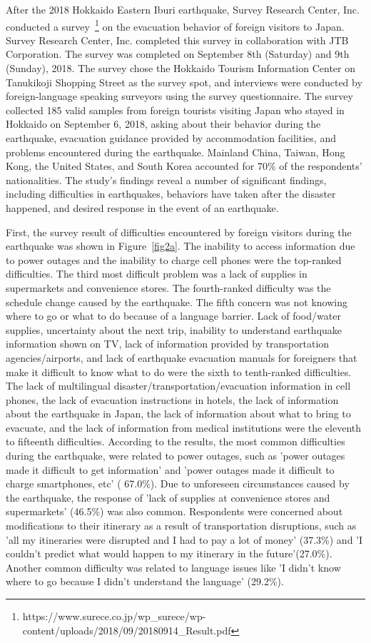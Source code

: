 After the 2018 Hokkaido Eastern Iburi earthquake, Survey Research Center, Inc. conducted a survey~\footnote{https://www.surece.co.jp/wp\_surece/wp-content/uploads/2018/09/20180914\_Result.pdf} on the evacuation behavior of foreign visitors to Japan. Survey Research Center, Inc. completed this survey in collaboration with JTB Corporation. The survey was completed on September 8th (Saturday) and 9th (Sunday), 2018. The survey chose the Hokkaido Tourism Information Center on Tanukikoji Shopping Street as the survey spot, and interviews were conducted by foreign-language speaking surveyors using the survey questionnaire. The survey collected 185 valid samples from foreign tourists visiting Japan who stayed in Hokkaido on September 6, 2018, asking about their behavior during the earthquake, evacuation guidance provided by accommodation facilities, and problems encountered during the earthquake. Mainland China, Taiwan, Hong Kong, the United States, and South Korea accounted for 70\% of the respondents' nationalities. The study's findings reveal a number of significant findings, including difficulties in earthquakes, behaviors have taken after the disaster happened, and desired response in the event of an earthquake.

First, the survey result of difficulties encountered by foreign visitors during the earthquake was shown in Figure~\ref{fig2a}. The inability to access information due to power outages and the inability to charge cell phones were the top-ranked difficulties. The third most difficult problem was a lack of supplies in supermarkets and convenience stores. The fourth-ranked difficulty was the schedule change caused by the earthquake. The fifth concern was not knowing where to go or what to do because of a language barrier. Lack of food/water supplies, uncertainty about the next trip, inability to understand earthquake information shown on TV, lack of information provided by transportation agencies/airports, and lack of earthquake evacuation manuals for foreigners that make it difficult to know what to do were the sixth to tenth-ranked difficulties. The lack of multilingual disaster/transportation/evacuation information in cell phones, the lack of evacuation instructions in hotels, the lack of information about the earthquake in Japan, the lack of information about what to bring to evacuate, and the lack of information from medical institutions were the eleventh to fifteenth difficulties. According to the results, the most common difficulties during the earthquake, were related to power outages, such as 'power outages made it difficult to get information' and 'power outages made it difficult to charge smartphones, etc' ( 67.0\%). Due to unforeseen circumstances caused by the earthquake, the response of 'lack of supplies at convenience stores and supermarkets'  (46.5\%) was also common. Respondents were concerned about modifications to their itinerary as a result of transportation disruptions, such as 'all my itineraries were disrupted and I had to pay a lot of money' (37.3\%) and 'I couldn't predict what would happen to my itinerary in the future'(27.0\%). Another common difficulty was related to language issues like 'I didn't know where to go because I didn't understand the language' (29.2\%).

